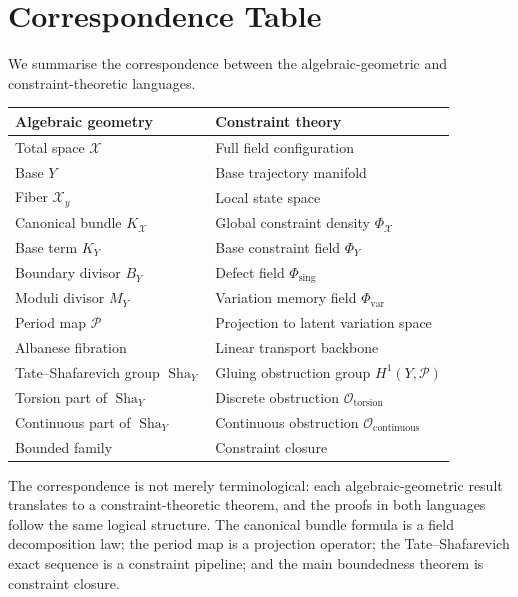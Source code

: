 \documentclass[11pt,openany]{book}
\newcommand{\Sha}{\operatorname{Sha}}
\begin{document}
\section{Correspondence Table}
\label{sec:correspondence-table}

We summarise the correspondence between the
algebraic-geometric and constraint-theoretic languages.

\medskip
\begin{center}
\begin{tabular}{ll}
\toprule
\textbf{Algebraic geometry} & \textbf{Constraint theory} \\
\midrule
Total space $\mathcal{X}$ &
  Full field configuration \\
Base $Y$ &
  Base trajectory manifold \\
Fiber $\mathcal{X}_y$ &
  Local state space \\
Canonical bundle $K_{\mathcal{X}}$ &
  Global constraint density $\Phi_{\mathcal{X}}$ \\
Base term $K_Y$ &
  Base constraint field $\Phi_Y$ \\
Boundary divisor $B_Y$ &
  Defect field $\Phi_{\mathrm{sing}}$ \\
Moduli divisor $M_Y$ &
  Variation memory field $\Phi_{\mathrm{var}}$ \\
Period map $\mathcal{P}$ &
  Projection to latent variation space \\
Albanese fibration &
  Linear transport backbone \\
Tate--Shafarevich group $\Sha_Y$ &
  Gluing obstruction group $H^1(Y, \mathcal{P})$ \\
Torsion part of $\Sha_Y$ &
  Discrete obstruction $\mathcal{O}_{\mathrm{torsion}}$ \\
Continuous part of $\Sha_Y$ &
  Continuous obstruction $\mathcal{O}_{\mathrm{continuous}}$ \\
Bounded family &
  Constraint closure \\
\bottomrule
\end{tabular}
\end{center}
\medskip

The correspondence is not merely terminological: each
algebraic-geometric result translates to a constraint-theoretic
theorem, and the proofs in both languages follow the same
logical structure.  The canonical bundle formula is a
field decomposition law; the period map is a projection
operator; the Tate--Shafarevich exact sequence is a
constraint pipeline; and the main boundedness theorem is
constraint closure.
\end{document}
